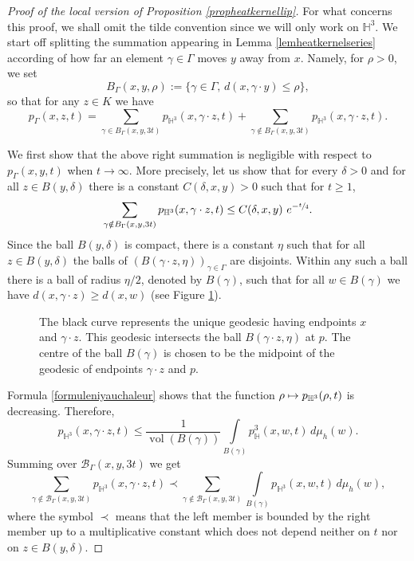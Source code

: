 \documentclass[JEP,XML,SOM,Unicode,NoFloatCountersInSection,published]{cedram}
\let\mathcal\mathscr
\def\mto{\mathchoice{\longmapsto}{\mapsto}{\mapsto}{\mapsto}}
\theoremstyle{plain}
\theoremstyle{definition}
\newcommand{\HH}{\mathbb{H}}
\newcommand{\inte}[1]{\underset{#1}{\int}}
\newcommand{\somme}[1]{\sum_{#1}}
\DeclareMathOperator{\vol}{vol}
\begin{document}
\begin{proof}[Proof of the local version of Proposition \ref{propheatkernellip}]
For what concerns this proof, we shall omit the tilde convention since we will only work on $\HH^3$. We start off splitting the summation appearing in Lemma \ref{lemheatkernelseries} according of how far an element $\gamma \in \Gamma$ moves $y$ away from $x$. Namely, for $\rho > 0$, we set
\[
B_{\Gamma}(x,y,\rho) := \{\gamma \in \Gamma, \,d(x, \gamma \cdot y) \le \rho\},
\]
so that for any $z \in K$ we have
\[
p_{\Gamma}(x,z,t) = \somme{\gamma \in B_{\Gamma}(x,y,3t)} p_{\HH^3}(x,\gamma \cdot z,t) + \somme{\gamma \notin B_{\Gamma}(x,y,3t)} p_{\HH^3}(x,\gamma \cdot z,t).
\]

We first show that the above right summation is negligible with respect to $p_{\Gamma}(x,y,t)$ when $t \to \infty$. More precisely, let us show that for every $\delta > 0$ and for all $z \in B(y, \delta)$ there is a constant $C(\delta,x,y) > 0$ such that for $t \ge 1$,
\[
\somme{\gamma \notin B_{\Gamma}(x,y,3t)} p_{\HH^3}(x,\gamma \cdot z,t) \le C(\delta,x,y) \ e^{- \sfrac{t}{4}}.
\]
Since the ball $B(y, \delta)$ is compact, there is a constant $\eta$ such that for all $z \in B(y, \delta)$ the balls of $(B(\gamma \cdot z,\eta))_{\gamma \in \Gamma}$ are disjoints. Within any such a ball there is a ball of radius $\eta / 2$, denoted by $B(\gamma)$, such that for all $w \in B(\gamma)$ we have $d(x,\gamma \cdot z) \ge d(x,w) $ (see Figure \ref{figure comptage plan}).

\begin{figure}[htb]
\begin{center}
\def\svgwidth{0.6 \columnwidth}

\caption{The black curve represents the unique geodesic having endpoints $x$ and $\gamma \cdot z$. This geodesic intersects the ball $B(\gamma \cdot z, \eta)$ at $p$. The centre of the ball $B(\gamma)$ is chosen to be the midpoint of the geodesic of endpoints $\gamma \cdot z$ and $p$.}
\label{figure comptage plan}
\end{center}
\end{figure}

Formula \ref{formuleniyauchaleur} shows that the function $ \rho \mto p_{\HH^3}(\rho,t) $ is decreasing. Therefore,
\[
p_{\HH^3}(x, \gamma \cdot z,t) \le \frac{1}{\vol(B(\gamma))} \inte{B(\gamma)} p_\HH^3(x, w, t) \,d \mu_h(w).
\]
Summing over $ \mathcal{B}_{\Gamma}(x,y,3t)$ we get
\[
\somme{\gamma \notin \mathcal{B}_{\Gamma}(x,y,3t) } p_{\HH^3}(x, \gamma \cdot z,t) \prec \somme{\gamma \notin \mathcal{B}_{\Gamma}(x,y,3t)} \inte{ B(\gamma)} p_{\HH^3}(x, w,t) \, d \mu_h(w),
\]
where the symbol $\prec$ means that the left member is bounded by the right member up to a multiplicative constant which does not depend neither on $t$ nor on $z \in B(y, \delta)$.


\end{proof}
\end{document}

